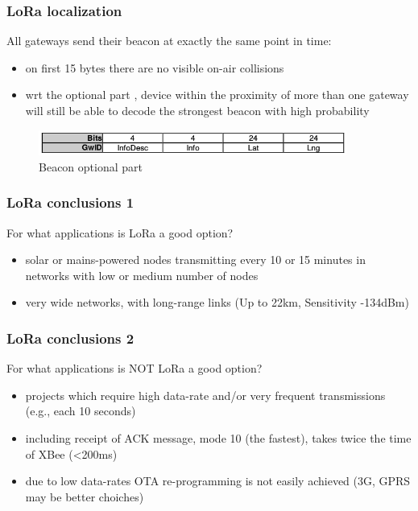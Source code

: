 \begin{frame}[fragile]
  \frametitle{LoRa localization}
  All gateways send their beacon at exactly the same point in time:
  \begin{itemize}
    \item on first 15 bytes there are no visible on-air collisions 
    \item wrt the optional part , device within the proximity of more than one
	  gateway will still be able to decode the strongest beacon with high probability
  \end{itemize}
  \begin{figure}
  \centering
  \includegraphics[width=0.9\textwidth]{img/optional.png}
  \caption{Beacon optional part}
 \end{figure}
  

\end{frame}

\begin{frame}[fragile]
  \frametitle{LoRa conclusions 1}
  For what applications is LoRa a good option?
  \begin{itemize}
    \item solar or mains-powered nodes transmitting every 10 or 15 minutes in networks with low or medium number of nodes
    \item very wide networks, with long-range links (Up to 22km, Sensitivity -134dBm) 
  \end{itemize}
  
\end{frame}
  
 \begin{frame}[fragile]
  \frametitle{LoRa conclusions 2}
  For what applications is NOT LoRa a good option?
  \begin{itemize}
    \item projects which require high data-rate and/or very frequent transmissions (e.g., each 10 seconds)
    \item including receipt of ACK message, mode 10 (the fastest), takes twice the time of XBee (<200ms)
    \item due to low data-rates OTA re-programming is not easily achieved (3G, GPRS may be better choiches)
  \end{itemize}
 
\end{frame}

